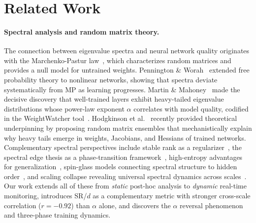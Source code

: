 \section{Related Work}
\label{sec:related}

\paragraph{Spectral analysis and random matrix theory.}
The connection between eigenvalue spectra and neural network quality originates with the Marchenko-Pastur law~\citep{marchenko_pastur1967}, which characterizes random matrices and provides a null model for untrained weights.
Pennington \& Worah~\citep{pennington2017} extended free probability theory to nonlinear networks, showing that spectra deviate systematically from MP as learning progresses.
Martin \& Mahoney~\citep{martin_mahoney_jmlr2021} made the decisive discovery that well-trained layers exhibit heavy-tailed eigenvalue distributions whose power-law exponent $\alpha$ correlates with model quality, codified in the WeightWatcher tool~\citep{weightwatcher}.
Hodgkinson et al.~\citep{hodgkinson2025} recently provided theoretical underpinning by proposing random matrix ensembles that mechanistically explain why heavy tails emerge in weights, Jacobians, and Hessians of trained networks.
Complementary spectral perspectives include stable rank as a regularizer~\citep{sanyal2019stable}, the spectral edge thesis as a phase-transition framework~\citep{spectral_edge_thesis}, high-entropy advantages for generalization~\citep{high_entropy_npj2026}, spin-glass models connecting spectral structure to hidden order~\citep{barney_spin_glass2024, winter_janssen2025}, and scaling collapse revealing universal spectral dynamics across scales~\citep{scaling_collapse_icml2025}.
Our work extends all of these from \emph{static} post-hoc analysis to \emph{dynamic} real-time monitoring, introduces SR/$d$ as a complementary metric with stronger cross-scale correlation ($r = -0.92$) than $\alpha$ alone, and discovers the $\alpha$ reversal phenomenon and three-phase training dynamics.

